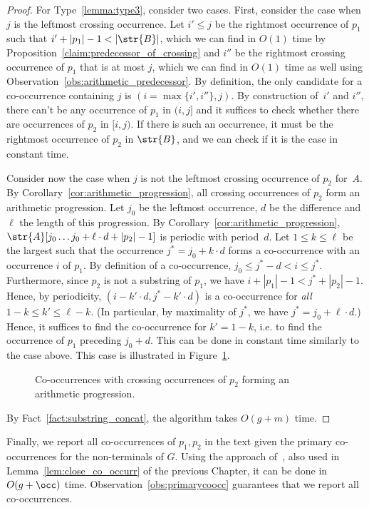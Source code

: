 \begin{proof}
For Type~\ref{lemma:type3}, consider two cases. First, consider the case when $j$ is the leftmost crossing occurrence. Let $i' \le j$ be the rightmost occurrence of $p_1$ such that $i'+|p_1|-1 < |\str{B}|$, which we can find in $O(1)$ time by Proposition~\ref{claim:predecessor_of_crossing} and $i''$ be the rightmost crossing occurrence of $p_1$ that is at most $j$, which we can find in $O(1)$ time as well using Observation~\ref{obs:arithmetic_predecessor}. By definition, the only candidate for a co-occurrence containing $j$ is $(i = \max\{i',i''\},j)$. By construction of~$i'$ and $i''$, there can't be any  occurrence of $p_1$ in $(i,j]$ and it suffices to check whether there are occurrences of $p_2$ in $[i,j)$. If there is such an occurrence, it must be the rightmost occurrence of $p_2$ in $\str{B}$, and we can check if it is the case in constant time. 

Consider now the case when $j$ is not the leftmost crossing occurrence of $p_2$ for~$A$.
By Corollary~\ref{cor:arithmetic_progression}, all crossing occurrences of $p_2$ form an arithmetic progression. Let $j_0$ be the leftmost occurrence, $d$ be the difference and $\ell$ the length of this progression. By Corollary~\ref{cor:arithmetic_progression}, $\str{A}[j_0 \dots j_0+\ell \cdot d+|p_2|-1]$ is periodic with period~$d$. Let $1 \le k \le \ell$ be the largest such that the occurrence $j^\ast = j_0+k \cdot d$ forms a co-occurrence with an occurrence $i$ of $p_1$. By definition of a co-occurrence, $j_0 \le j^\ast-d < i \le j^\ast$. Furthermore, since $p_2$ is not a substring of $p_1$, we have $i+|p_1|-1 < j^\ast+|p_2|-1$. Hence, by periodicity, $(i-k'\cdot d, j^\ast-k' \cdot d)$ is a co-occurrence for \emph{all} $1-k \le k' \le \ell-k$. (In particular, by maximality of $j^\ast$, we have $j^\ast = j_0+\ell\cdot d$.) Hence, it suffices to find the co-occurrence for $k'=1-k$, i.e. to find the occurrence of $p_1$ preceding $j_0+d$. This can be done in constant time similarly to the case above. This case is illustrated in Figure~\ref{fig:p2_crossing_periodic}.


\begin{figure}
\centering
{}
\caption{Co-occurrences with crossing occurrences of $p_2$ forming an arithmetic progression.}
\label{fig:p2_crossing_periodic}
\end{figure}

By Fact~\ref{fact:substring_concat}, the algorithm takes $O(g+m)$ time. 

\end{proof}

Finally, we report all co-occurrences of $p_1,p_2$ in the text given the primary co-occurrences for the non-terminals of $G$. Using the approach of~\cite[Section 6.4]{talg/ChristiansenEKN21}, also used in Lemma~\ref{lem:close_co_occurr} of the previous Chapter, it can be done in $O(g+\occ)$ time. Observation~\ref{obs:primarycoocc} guarantees that we report all co-occurrences.
